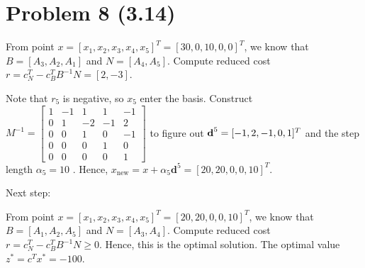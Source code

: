 \documentclass[12pt]{article}
\begin{document}
\section*{Problem 8 (3.14)}

From point $x = [x_1, x_2, x_3, x_4, x_5]^T = [30, 0, 10, 0, 0]^T$, we know that $B = [A_3, A_2, A_1]$ and $N = [A_4, A_5]$. Compute reduced cost $r = c_N^T - c_B^TB^{-1}N = [2, -3]$.

Note that $r_5$ is negative, so $x_5$ enter the basis. Construct $M^{-1} = \begin{bmatrix}
1 & -1 & 1 & 1 & -1 \\
0 & 1 & -2 & -1 & 2 \\
0 & 0 & 1 & 0 & -1 \\
0 & 0 & 0 & 1 & 0 \\
0 & 0 & 0 & 0 & 1
\end{bmatrix}$ to figure out $\textbf d^5 = [-1, 2, -1, 0, 1]^T$  and the step length $\alpha_5 = 10$ . Hence, $x_{\text{new}} = x + \alpha_5\textbf{d}^5 = [20, 20, 0, 0, 10]^T$. 

Next step:

From point $x = [x_1, x_2, x_3, x_4, x_5]^T = [20, 20, 0, 0,  10]^T$, we know that $B = [A_1, A_2, A_5]$ and $N = [A_3, A_4]$. Compute reduced cost $r = c_N^T - c_B^TB^{-1}N \geqslant 0$. Hence, this is the optimal solution. The optimal value $z^* = c^Tx^* = -100 $.
\end{document}
